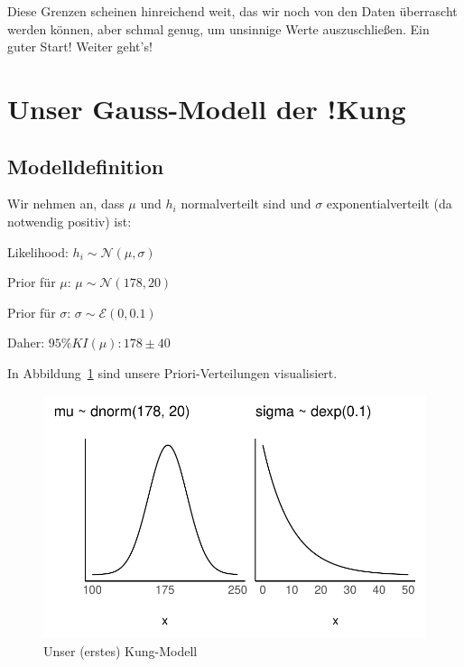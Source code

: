 \documentclass[
  a4paper,
  DIV=11]{scrreprt}
\theoremstyle{definition}
\theoremstyle{remark}
\begin{document}
Diese Grenzen scheinen hinreichend weit, das wir noch von den Daten
überrascht werden können, aber schmal genug, um unsinnige Werte
auszuschließen. Ein guter Start! Weiter geht's!

\hypertarget{unser-gauss-modell-der-kung}{%
\section{Unser Gauss-Modell der
!Kung}\label{unser-gauss-modell-der-kung}}

\hypertarget{modelldefinition}{%
\subsection{Modelldefinition}\label{modelldefinition}}

Wir nehmen an, dass \(\mu\) und \(h_i\) normalverteilt sind und
\(\sigma\) exponentialverteilt (da notwendig positiv) ist:

Likelihood: \(h_i \sim \mathcal{N}(\mu, \sigma)\)

Prior für \(\mu\): \(\mu \sim \mathcal{N}(178, 20)\)

Prior für \(\sigma\): \(\sigma \sim \mathcal{E}(0, 0.1)\)

Daher: \(95\%KI( \mu): 178 \pm 40\)

In Abbildung~\ref{fig-kung-model1} sind unsere Priori-Verteilungen
visualisiert.

\begin{figure}

{\centering \includegraphics{./gauss_files/figure-pdf/fig-kung-model1-1.pdf}

}

\caption{\label{fig-kung-model1}Unser (erstes) Kung-Modell}

\end{figure}
\end{document}
